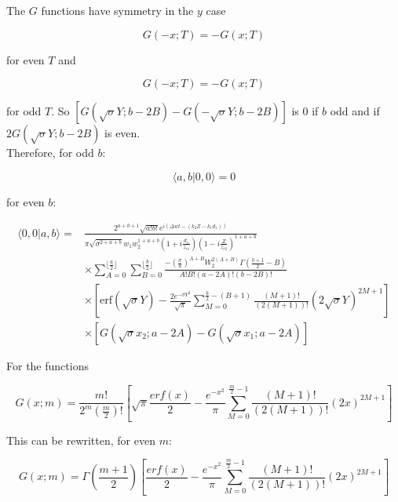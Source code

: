 \documentclass[aps,twoside,secnumarabic,balancelastpage,amsmath,amssymb,nofootinbib,hyperref=pdftex]{revtex4}
\begin{document}
The $G$ functions have symmetry in the $y$ case

\begin{equation*}
	G(-x;T) = -G(x;T)
\end{equation*}

for even $T$ and 

\begin{equation*}
	G(-x;T) = -G(x;T)
\end{equation*}

for odd $T$. So $ 		[
		G(\sqrt{\sigma}Y;b-2B)
		-
		G(-\sqrt{\sigma}Y;b-2B)		
	]$ is 0 if $b$ odd and if $2G(\sqrt{\sigma}Y;b-2B)$ is even.\\ 
Therefore, for odd $b$:

\begin{equation*}
	\langle a,b| 0,0 \rangle=0
\end{equation*}

for even $b$:

\begin{align*}
 \langle 0,0 | a,b \rangle =&
 	\frac
 	{
 		2^{a+b+1}
 		\sqrt{a!b!}
 		e^{i(\Delta w t 
			- (k_2 Z - k_1d_1)
		)}
 	}
 	{
 		\pi \sqrt{\sigma^{2+a+b}}
 		w_1 w_2^{1+a+b}
 		(1+i \frac{d_1}{z_{r1}})
 		(1-i \frac{Z}{z_{r2}})^{1+a+b}	
 	}
 		\\& \times
			\sum_{A=0}^{\lfloor{\frac{a}{2}} \rfloor}
			\sum_{B=0}^{\lfloor{\frac{b}{2}} \rfloor}
			\frac
			{
				-(\frac{\sigma}{8})^{A+B}
				W_2^{2(A+B)}
				\Gamma(\frac{b+1}{2}-B)		
			}
			{
				A!B!(a-2A)!(b-2B)!
			}
		\\& \times
			[
				\mathrm{erf}(\sqrt{\sigma}Y)
				-
				\frac{2e^{-\sigma Y^2}}{\sqrt{\pi}}
				\sum_{M=0}^{\frac{b}{2}-(B+1)}
				\frac{(M+1)!}{(2(M+1))!}
				(2\sqrt{\sigma}Y)^{2M+1}
			]
		\\& \times
			[
				G(\sqrt{\sigma}x_2;a-2A)
				-
				G(\sqrt{\sigma}x_1;a-2A)			
			]
\end{align*}

For the functions

\begin{equation*}
	G(x;m) = \frac{m!}{2^m (\frac{m}{2})!}
	[
		\sqrt{\pi}\frac{erf(x)}{2}
		-
		\frac{e^{-x^2}}{\pi}
		\sum_{M=0}^{\frac{m}{2}-1}
		\frac{(M+1)!}{(2(M+1))!} (2x)^{2M+1}	
	]
\end{equation*}

This can be rewritten, for even $m$:

\begin{equation*}
	G(x;m) = \Gamma(\frac{m+1}{2})
	[
		\frac{erf(x)}{2}
		-
		\frac{e^{-x^2}}{\pi}
		\sum_{M=0}^{\frac{m}{2}-1}
		\frac{(M+1)!}{(2(M+1))!} (2x)^{2M+1}	
	]
\end{equation*}
\end{document}
